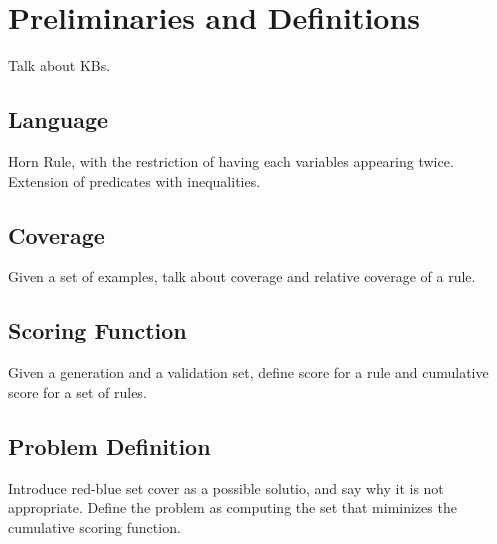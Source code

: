 \section{Preliminaries and Definitions}
Talk about KBs.

\subsection{Language}
Horn Rule, with the restriction of having each variables appearing twice.
Extension of predicates with inequalities.

\subsection{Coverage}
Given a set of examples, talk about coverage and relative coverage of a rule.

\subsection{Scoring Function}
Given a generation and a validation set, define score for a rule and cumulative score for a set of rules.

\subsection{Problem Definition}
Introduce red-blue set cover as a possible solutio, and say why it is not appropriate.
Define the problem as computing the set that miminizes the cumulative scoring function.